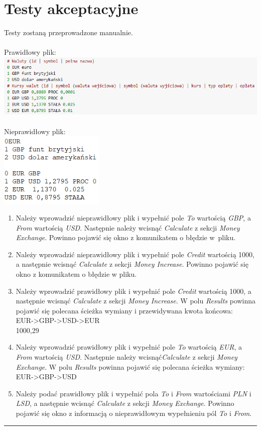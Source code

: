 \documentclass[a4paper,11pt]{article}
\newcommand{\linia}{\rule{\linewidth}{0.4mm}}
\begin{document}
\section{Testy akceptacyjne}
Testy zostaną przeprowadzone manualnie.
\\\\
Prawidłowy plik:
\\
\includegraphics[width= 16cm]{FileFormat}
\\\\
Nieprawidłowy plik:
\\
\includegraphics[width= 5cm]{FaultyFileFormat}

\begin{enumerate}
\item Należy wprowadzić nieprawidłowy plik i wypełnić pole \textit{To} wartością \textit{GBP}, a \textit{From} wartością \textit{USD}. Następnie należy wcisnąć \textit{Calculate} z sekcji \textit{Money Exchange}. Powinno pojawić się okno z komunikatem o błędzie w~pliku.
\item Należy wprowadzić nieprawidłowy plik i wypełnić pole \textit{Credit} wartością 1000, a następnie wcisnąć \textit{Calculate} z sekcji \textit{Money Increase}. Powinno pojawić się okno z komunikatem o błędzie w pliku.
\item Należy wprowadzić prawidłowy plik i wypełnić pole \textit{Credit} wartością 1000, a następnie wcisnąć \textit{Calculate} z sekcji \textit{Money Increase}. W polu \textit{Results} powinna pojawić się polecana ścieżka wymiany i przewidywana kwota końcowa:
\\EUR->GBP->USD->EUR
\\1000,29
\item Należy wprowadzić prawidłowy plik i wypełnić pole \textit{To} wartością \textit{EUR}, a \textit{From} wartością \textit{USD}. Następnie należy wcisnąć\textit{Calculate} z sekcji \textit{Money Exchange}. W polu \textit{Results} powinna pojawić się polecana ścieżka wymiany:
\\EUR->GBP->USD
\item Należy podać prawidłowy plik i wypełnić pola \textit{To} i \textit{From} wartościami \textit{PLN} i \textit{LSD}, a następnie wcisnąć \textit{Calculate} z sekcji \textit{Money Exchange}. Powinno pojawić się okno z informacją o nieprawidłowym wypełnieniu pól \textit{To} i \textit{From}.
\end{enumerate}
\noindent\linia
\end{document}
